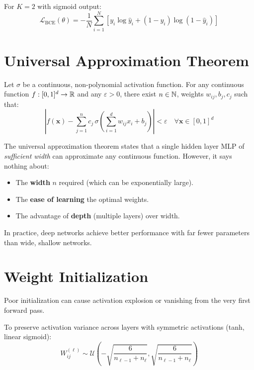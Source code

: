 For $K=2$ with sigmoid output:
\[
\mathcal{L}_{\mathrm{BCE}}(\theta) = -\frac{1}{N}\sum_{i=1}^{N} \left[y_i \log \hat{y}_i + (1-y_i)\log(1-\hat{y}_i)\right]
\]

\section{Universal Approximation Theorem}
\label{sec:uat}

\begin{theorem}
\label{thm:uat}
Let $\sigma$ be a continuous, non-polynomial activation function. For any continuous function $f : [0,1]^d \to \mathbb{R}$ and any $\varepsilon > 0$, there exist $n \in \mathbb{N}$, weights $w_{ij}, b_j, c_j$ such that:
\[
\left| f(\bm{x}) - \sum_{j=1}^{n} c_j \, \sigma\!\left(\sum_{i=1}^d w_{ij} x_i + b_j\right) \right| < \varepsilon \quad \forall \bm{x} \in [0,1]^d
\]
\end{theorem}

\begin{intuition}
The universal approximation theorem states that a single hidden layer MLP of \emph{sufficient width} can approximate any continuous function. However, it says nothing about:
\begin{itemize}
\item The \textbf{width} $n$ required (which can be exponentially large).
\item The \textbf{ease of learning} the optimal weights.
\item The advantage of \textbf{depth} (multiple layers) over width.
\end{itemize}
In practice, deep networks achieve better performance with far fewer parameters than wide, shallow networks.
\end{intuition}

\section{Weight Initialization}
\label{sec:init}

Poor initialization can cause activation explosion or vanishing from the very first forward pass.

\begin{mathbox}[title=\textbf{Xavier/Glorot Initialization (2010)}]
To preserve activation variance across layers with symmetric activations (tanh, linear sigmoid):
\[
W^{(\ell)}_{ij} \sim \mathcal{U}\!\left(-\sqrt{\frac{6}{n_{\ell-1}+n_\ell}}, \sqrt{\frac{6}{n_{\ell-1}+n_\ell}}\right)
\]
\end{mathbox}

